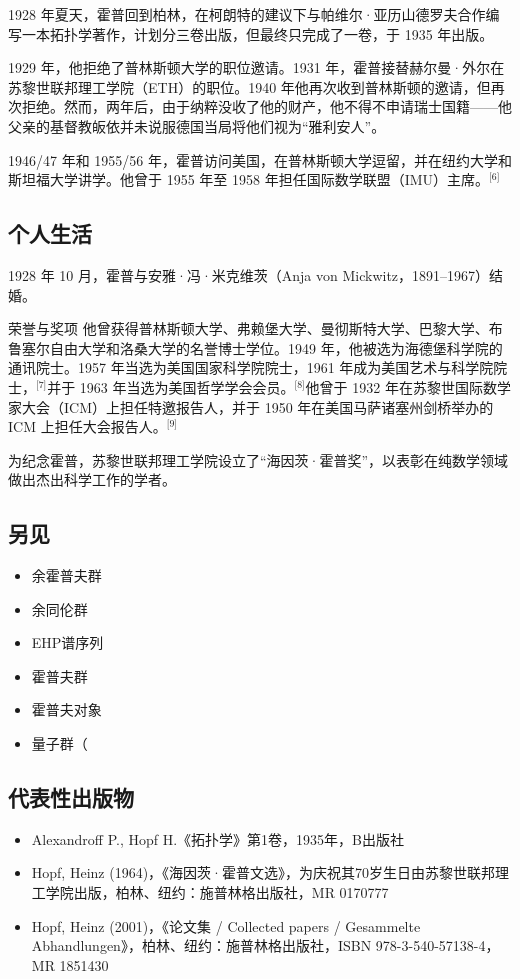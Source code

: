 1928 年夏天，霍普回到柏林，在柯朗特的建议下与帕维尔·亚历山德罗夫合作编写一本拓扑学著作，计划分三卷出版，但最终只完成了一卷，于 1935 年出版。

1929 年，他拒绝了普林斯顿大学的职位邀请。1931 年，霍普接替赫尔曼·外尔在苏黎世联邦理工学院（ETH）的职位。1940 年他再次收到普林斯顿的邀请，但再次拒绝。然而，两年后，由于纳粹没收了他的财产，他不得不申请瑞士国籍——他父亲的基督教皈依并未说服德国当局将他们视为“雅利安人”。

1946/47 年和 1955/56 年，霍普访问美国，在普林斯顿大学逗留，并在纽约大学和斯坦福大学讲学。他曾于 1955 年至 1958 年担任国际数学联盟（IMU）主席。\(^\text{[6]}\)
\subsection{个人生活}
1928 年 10 月，霍普与安雅·冯·米克维茨（Anja von Mickwitz，1891–1967）结婚。

荣誉与奖项
他曾获得普林斯顿大学、弗赖堡大学、曼彻斯特大学、巴黎大学、布鲁塞尔自由大学和洛桑大学的名誉博士学位。1949 年，他被选为海德堡科学院的通讯院士。1957 年当选为美国国家科学院院士，1961 年成为美国艺术与科学院院士，\(^\text{[7]}\)并于 1963 年当选为美国哲学学会会员。\(^\text{[8]}\)他曾于 1932 年在苏黎世国际数学家大会（ICM）上担任特邀报告人，并于 1950 年在美国马萨诸塞州剑桥举办的 ICM 上担任大会报告人。\(^\text{[9]}\)

为纪念霍普，苏黎世联邦理工学院设立了“海因茨·霍普奖”，以表彰在纯数学领域做出杰出科学工作的学者。
\subsection{另见}
\begin{itemize}
\item 余霍普夫群
\item 余同伦群
\item EHP谱序列
\item 霍普夫群
\item 霍普夫对象
\item 量子群（
\end{itemize}
\subsection{代表性出版物}
\begin{itemize}
\item Alexandroff P., Hopf H.《拓扑学》第1卷，1935年，B出版社
\item Hopf, Heinz (1964)，《海因茨·霍普文选》，为庆祝其70岁生日由苏黎世联邦理工学院出版，柏林、纽约：施普林格出版社，MR 0170777
\item Hopf, Heinz (2001)，《论文集 / Collected papers / Gesammelte Abhandlungen》，柏林、纽约：施普林格出版社，ISBN 978-3-540-57138-4，MR 1851430
\end{itemize}